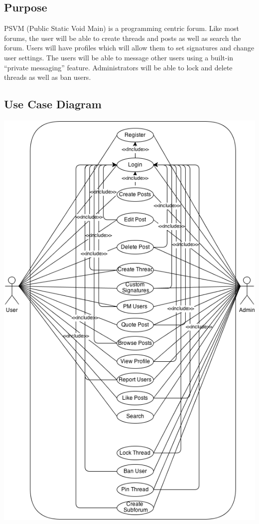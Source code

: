 \documentclass[12pt]{scrartcl}
\begin{document}
\subsection{Purpose}

PSVM (Public Static Void Main) is a programming centric forum. Like most forums, the user will be able to create threads and posts as well as search the forum. Users will have profiles which will allow them to set signatures and change user settings.  The users will be able to message other users using a built-in “private messaging” feature. Administrators will be able to lock and delete threads as well as ban users.

\subsection{Use Case Diagram}

\includegraphics[scale=0.8]{use-case2.png}
\end{document}

